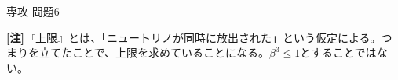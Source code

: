 \documentclass[fleqn]{jbook}
\begin{document}
\begin{answer}{専攻 問題6}{}
\begin{subanswers}
{\bf{[注]}}『上限』とは、「ニュートリノが同時に放出された」という仮定による。つまりを立てたことで、上限を求めていることになる。$\beta^3 \leq 1$とすることではない。
\end{subanswers}
\end{answer}
\end{document}
